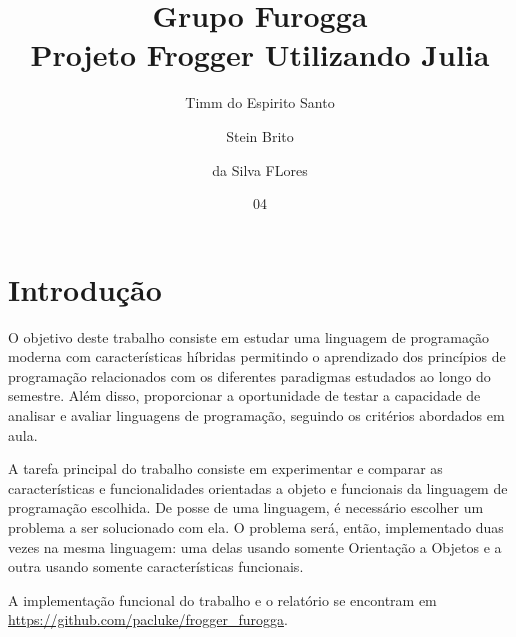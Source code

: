 \documentclass[rel_mlp]{iiufrgs}
\title{Grupo Furogga \\ Projeto Frogger Utilizando Julia \\ }
\author{Timm do Espirito Santo}{Augusto} %
\author{Stein Brito}{Eduardo} %
\author{da Silva FLores}{Lucas} %
\date{04}{2018}
\begin{document}
\maketitle      


\tableofcontents








%
\chapter{Introdução} \label{intro}



O objetivo deste trabalho consiste em estudar uma linguagem de programação moderna com características híbridas permitindo o aprendizado dos princípios de programação relacionados com os diferentes paradigmas estudados ao longo do semestre. Além disso, proporcionar a oportunidade de testar a capacidade de analisar e avaliar linguagens de programação, seguindo os critérios abordados em aula.

A tarefa principal do trabalho consiste em experimentar e comparar as características e funcionalidades orientadas a objeto e funcionais da linguagem de programação escolhida. De posse de uma linguagem, é necessário escolher um problema a ser solucionado com ela. O problema será, então, implementado duas vezes na mesma linguagem: uma delas usando somente Orientação a Objetos e a outra usando somente características funcionais.

A implementação funcional do trabalho e o relatório se encontram em \url{https://github.com/pacluke/frogger_furogga}.



\end{document}
